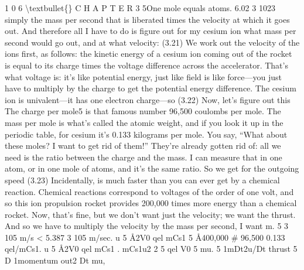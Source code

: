 \documentclass[10pt,oneside]{article}
\begin{document}
1 0 6 \textbackslash{}textbullet\{\} C H A P T E R  3 5One mole equals atoms. 6.02 3 1023 simply the mass per second that is liberated times the velocity at which it goes out. And therefore all I have to do is figure out for my cesium ion what mass per second would go out, and at what velocity: (3.21) We work out the velocity of the ions first, as follows: the kinetic energy of a cesium ion coming out of the rocket is equal to its charge times the voltage difference across the accelerator. That’s what voltage is: it’s like potential energy, just like field is like force---you just have to multiply by the charge to get the potential energy difference. The cesium ion is univalent---it has one electron charge---so (3.22) Now, let’s figure out this The charge per mole5 is that famous number 96,500 coulombs per mole. The mass per mole is what’s called the atomic weight, and if you look it up in the periodic table, for cesium it’s 0.133 kilograms per mole. You say, “What about these moles? I want to get rid of them!” They’re already gotten rid of: all we need is the ratio between the charge and the mass. I can measure that in one atom, or in one mole of atoms, and it’s the same ratio. So we get for the outgoing speed (3.23) Incidentally, is much faster than you can ever get by a chemical reaction. Chemical reactions correspond to voltages of the order of one volt, and so this ion propulsion rocket provides 200,000 times more energy than a chemical rocket. Now, that’s fine, but we don’t want just the velocity; we want the thrust. And so we have to multiply the velocity by the mass per second, I want m. 5 3 105 m/s < 5.387 3 105 m/sec. u 5 Å2V0 qel mCs1 5 Å400,000 \# 96,500 0.133 qel/mCs1. u 5 Å2V0 qel mCs1 . mCs1u2 2 5 qel V0 5 mu. 5 1mDt2u/Dt thrust 5 D 1momentum out2 Dt mu,\par
\end{document}
